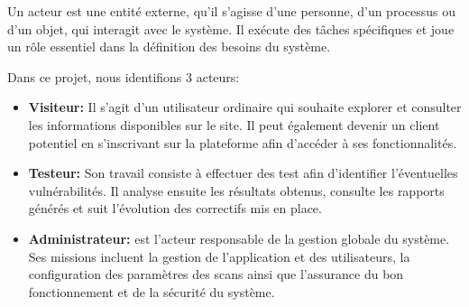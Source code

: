 \begin{justify}
    Un acteur est une entité externe, qu’il s’agisse d’une personne, d’un processus ou d’un objet, qui interagit avec le système. Il exécute des tâches spécifiques et joue un rôle essentiel dans la définition des besoins du système\cite{acteur}.
    
    Dans ce projet, nous identifions 3 acteurs: 
    \begin{itemize}[label=$\bullet$]
        \item \textbf{Visiteur:} Il s’agit d’un utilisateur ordinaire qui souhaite explorer et consulter les informations disponibles sur le site. Il peut également devenir un client potentiel en s’inscrivant sur la plateforme afin d’accéder à ses fonctionnalités.
        \item \textbf{Testeur:} Son travail consiste à effectuer des test afin d’identifier l’éventuelles vulnérabilités. Il analyse ensuite les résultats obtenus, consulte les rapports générés et suit l’évolution des correctifs mis en place.
        \item \textbf{Administrateur:} est l’acteur responsable de la gestion globale du système. Ses missions incluent la gestion de l’application et des utilisateurs, la configuration des paramètres des scans ainsi que l’assurance du bon fonctionnement et de la sécurité du système.
    \end{itemize}
\end{justify}